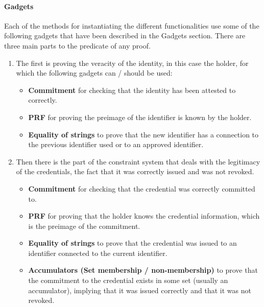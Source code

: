\endgroup
\vspace{-1em}

\paragraph{Gadgets}
Each of the methods for instantiating the different functionalities use some of the following gadgets that have been described in the Gadgets section. There are three main parts to the predicate of any proof.
\begin{enumerate}
\item The first is proving the veracity of the identity, in this case the holder, for which the following gadgets can / should be used:
	\begin{itemize}
	\item \textbf{Commitment} for checking that the identity has been attested to correctly.
	\item \textbf{PRF} for proving the preimage of the identifier is known by the holder.
	\item \textbf{Equality of strings} to prove that the new identifier has a connection to the previous identifier used or to an approved identifier.
	\end{itemize}

\item Then there is the part of the constraint system that deals with the legitimacy of the credentials, the fact that it was correctly issued and was not revoked. 	
	\begin{itemize}
	\item \textbf{Commitment} for checking that the credential was correctly committed to.	
	\item \textbf{PRF} for proving that the holder knows the credential information, which is the preimage of the commitment.
	\item \textbf{Equality of strings} to prove that the credential was issued to an identifier connected to the current identifier.
	\item \textbf{Accumulators (Set membership / non-membership)} to prove that the commitment to the credential exists in some set (usually an accumulator), implying that it was issued correctly and that it was not revoked.
	\end{itemize}


\end{enumerate}
